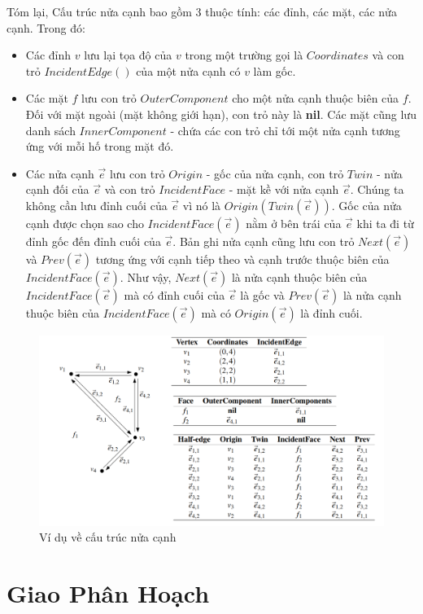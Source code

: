 \documentclass[15pt]{article}
\begin{document}
Tóm lại, Cấu trúc nửa cạnh bao gồm 3 thuộc tính: các đỉnh, các mặt, các nửa cạnh. Trong đó:
\begin{itemize}
    \item Các đỉnh $v$ lưu lại tọa độ của $v$ trong một trường gọi là $Coordinates$ và con trỏ $IncidentEdge()$ của một nửa cạnh có $v$ làm gốc.
    \item Các mặt $f$ lưu con trỏ $OuterComponent$ cho một  nửa cạnh thuộc biên của $f$. Đối với mặt ngoài (mặt không giới hạn), con trỏ này là \textbf{nil}. Các mặt cũng lưu danh sách $InnerComponent$ - chứa các con trỏ chỉ tới một nửa cạnh tương ứng với mỗi hố trong mặt đó.
    \item Các nửa cạnh $\vec{e}$ lưu con trỏ $Origin$ - gốc của nửa cạnh, con trỏ $Twin$ - nửa cạnh đối của $\vec{e}$ và con trỏ $IncidentFace$ - mặt kề với nửa cạnh $\vec{e}$. Chúng ta không cần lưu đỉnh cuối của $\vec{e}$ vì nó là $Origin(Twin(\vec{e}))$. Gốc của nửa cạnh được chọn sao cho $IncidentFace(\vec{e})$ nằm ở bên trái của $\vec{e}$ khi ta đi từ đỉnh gốc đến đỉnh cuối của $\vec{e}$. Bản ghi nửa cạnh cũng lưu con trỏ $Next(\vec{e})$ và $Prev(\vec{e})$ tương ứng với cạnh tiếp theo và cạnh trước thuộc biên của $IncidentFace(\vec{e})$. Như vậy, $Next(\vec{e})$ là nửa cạnh thuộc biên của  $IncidentFace(\vec{e})$ mà có đỉnh cuối của $\vec{e}$ là gốc và $Prev(\vec{e})$ là nửa cạnh thuộc biên của $IncidentFace(\vec{e})$ mà có $Origin(\vec{e})$ là đỉnh cuối.
\end{itemize}

\begin{figure}[h!]
\centering
\includegraphics[scale=0.5]{./dcel2.png}
\caption{Ví dụ về cấu trúc nửa cạnh}
\label{fig: ví dụ về cấu trúc nửa cạnh}
\end{figure}

\section{Giao Phân Hoạch}
\end{document}
